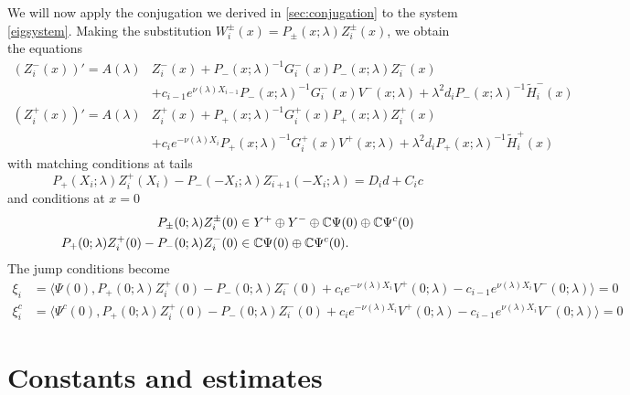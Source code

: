 \documentclass[thesis.tex]{subfiles}
\begin{document}
We will now apply the conjugation we derived in \cref{sec:conjugation} to the system \cref{eigsystem}. Making the substitution $W_i^\pm(x) = P_\pm(x; \lambda) Z_i^\pm(x)$, we obtain the equations
\begin{equation}\label{systemZ}
\begin{aligned}
(Z_i^-(x))' = A(\lambda) &Z_i^-(x) + P_-(x; \lambda)^{-1} G_i^-(x) P_-(x; \lambda) Z_i^-(x)  \\
&+ c_{i-1} e^{\nu(\lambda)X_{i-1}} P_-(x; \lambda)^{-1} G_i^-(x)V^-(x; \lambda) + \lambda^2 d_i P_-(x; \lambda)^{-1} \tilde{H}_i^-(x) \\
(Z_i^+(x))' = A(\lambda) &Z_i^+(x) + P_+(x; \lambda)^{-1} G_i^+(x) P_+(x; \lambda) Z_i^+(x)  \\
&+ c_i e^{-\nu(\lambda)X_i} P_+(x; \lambda)^{-1} G_i^+(x)V^+(x; \lambda) + \lambda^2 d_i P_+(x; \lambda)^{-1} \tilde{H}_i^+(x)
\end{aligned}
\end{equation}
with matching conditions at tails
\begin{equation}\label{systemmiddle}
P_+(X_i; \lambda) Z_i^+(X_i) - P_-(-X_i; \lambda) Z_{i+1}^-(-X_i; \lambda) = D_i d + C_i c 
\end{equation}
and conditions at $x = 0$
\begin{align}
P_\pm(0; \lambda) Z_i^\pm(0) &\in Y^+ \oplus Y^- \oplus \mathbb{C} \Psi(0) \oplus \mathbb{C} \Psi^c(0) \label{systemcenter1} \\
P_+(0; \lambda) Z_i^+(0) - P_-(0; \lambda) Z_i^-(0) &\in \mathbb{C} \Psi(0) \oplus \mathbb{C} \Psi^c(0) \label{systemcenter2}.
\end{align}
The jump conditions become
\begin{equation}\label{jumpcondZ}
\begin{aligned}
\xi_i &= \langle \Psi(0), P_+(0; \lambda) Z_i^+(0) - P_-(0; \lambda) Z_i^-(0) + c_i e^{-\nu(\lambda)X_i}V^+(0; \lambda) - c_{i-1} e^{\nu(\lambda)X_i} V^-(0; \lambda) \rangle = 0  \\
\xi_i^c &= \langle \Psi^c(0), P_+(0; \lambda) Z_i^+(0) - P_-(0; \lambda) Z_i^-(0) + c_i e^{-\nu(\lambda)X_i}V^+(0; \lambda) - c_{i-1} e^{\nu(\lambda)X_i} V^-(0; \lambda) \rangle = 0 
\end{aligned}
\end{equation}

\section{Constants and estimates}
\end{document}
